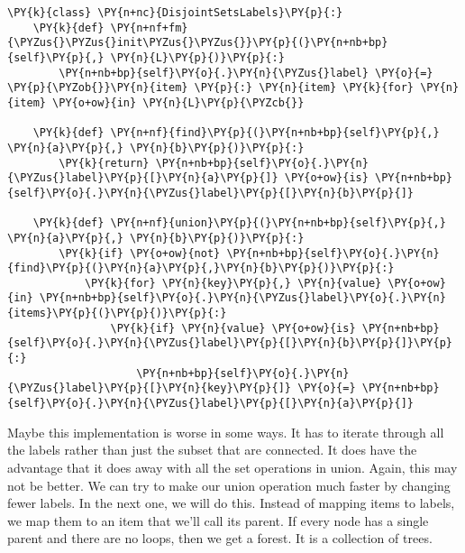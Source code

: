 \begin{Verbatim}[commandchars=\\\{\}]
\PY{k}{class} \PY{n+nc}{DisjointSetsLabels}\PY{p}{:}
    \PY{k}{def} \PY{n+nf+fm}{\PYZus{}\PYZus{}init\PYZus{}\PYZus{}}\PY{p}{(}\PY{n+nb+bp}{self}\PY{p}{,} \PY{n}{L}\PY{p}{)}\PY{p}{:}
        \PY{n+nb+bp}{self}\PY{o}{.}\PY{n}{\PYZus{}label} \PY{o}{=} \PY{p}{\PYZob{}}\PY{n}{item} \PY{p}{:} \PY{n}{item} \PY{k}{for} \PY{n}{item} \PY{o+ow}{in} \PY{n}{L}\PY{p}{\PYZcb{}}

    \PY{k}{def} \PY{n+nf}{find}\PY{p}{(}\PY{n+nb+bp}{self}\PY{p}{,} \PY{n}{a}\PY{p}{,} \PY{n}{b}\PY{p}{)}\PY{p}{:}
        \PY{k}{return} \PY{n+nb+bp}{self}\PY{o}{.}\PY{n}{\PYZus{}label}\PY{p}{[}\PY{n}{a}\PY{p}{]} \PY{o+ow}{is} \PY{n+nb+bp}{self}\PY{o}{.}\PY{n}{\PYZus{}label}\PY{p}{[}\PY{n}{b}\PY{p}{]}

    \PY{k}{def} \PY{n+nf}{union}\PY{p}{(}\PY{n+nb+bp}{self}\PY{p}{,} \PY{n}{a}\PY{p}{,} \PY{n}{b}\PY{p}{)}\PY{p}{:}
        \PY{k}{if} \PY{o+ow}{not} \PY{n+nb+bp}{self}\PY{o}{.}\PY{n}{find}\PY{p}{(}\PY{n}{a}\PY{p}{,}\PY{n}{b}\PY{p}{)}\PY{p}{:}
            \PY{k}{for} \PY{n}{key}\PY{p}{,} \PY{n}{value} \PY{o+ow}{in} \PY{n+nb+bp}{self}\PY{o}{.}\PY{n}{\PYZus{}label}\PY{o}{.}\PY{n}{items}\PY{p}{(}\PY{p}{)}\PY{p}{:}
                \PY{k}{if} \PY{n}{value} \PY{o+ow}{is} \PY{n+nb+bp}{self}\PY{o}{.}\PY{n}{\PYZus{}label}\PY{p}{[}\PY{n}{b}\PY{p}{]}\PY{p}{:}
                    \PY{n+nb+bp}{self}\PY{o}{.}\PY{n}{\PYZus{}label}\PY{p}{[}\PY{n}{key}\PY{p}{]} \PY{o}{=} \PY{n+nb+bp}{self}\PY{o}{.}\PY{n}{\PYZus{}label}\PY{p}{[}\PY{n}{a}\PY{p}{]}
\end{Verbatim}



Maybe this implementation is worse in some ways. It has to iterate through all the labels rather than just the subset that are connected. It does have the advantage that it does away with all the set operations in union. Again, this may not be better.
We can try to make our union operation much faster by changing fewer labels. In the next one, we will do this. Instead of mapping items to labels, we map them to an item that we'll call its parent. If every node has a single parent and there are no loops, then we get a forest. It is a collection of trees.

